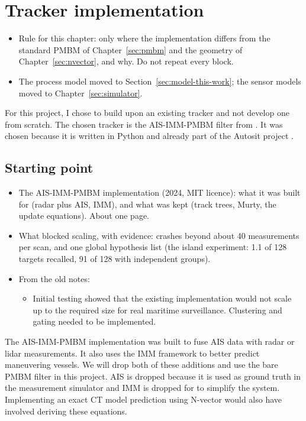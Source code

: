 \section{Tracker implementation}
\label{sec:implementation}
\label{sec:method}
\begin{itemize}
    \item Rule for this chapter: only where the implementation differs from the standard PMBM of Chapter~\ref{sec:pmbm} and the geometry of Chapter~\ref{sec:nvector}, and why. Do not repeat every block.
    \item The process model moved to Section~\ref{sec:model-this-work}; the sensor models moved to Chapter~\ref{sec:simulator}.
\end{itemize}

For this project, I chose to build upon an existing tracker and not develop one from scratch. The chosen tracker is the AIS-IMM-PMBM filter from \cite{ais_imm_pmbm}. It was chosen because it is written in Python and already part of the Autosit project \cite{autosit}.

\subsection{Starting point}
\label{sec:impl-start}
\begin{itemize}
    \item The AIS-IMM-PMBM implementation (2024, MIT licence): what it was built for (radar plus AIS, IMM), and what was kept (track trees, Murty, the update equations). About one page.
    \item What blocked scaling, with evidence: crashes beyond about 40 measurements per scan, and one global hypothesis list (the island experiment: 1.1 of 128 targets recalled, 91 of 128 with independent groups).
    \item From the old notes:
    \begin{itemize}
    \item Initial testing showed that the existing implementation would not scale up to the required size for real maritime surveillance. Clustering and gating needed to be implemented.
    \end{itemize}
\end{itemize}

The AIS-IMM-PMBM implementation was built to fuse AIS data with radar or lidar measurements. It also uses the IMM framework to better predict maneuvering vessels. We will drop both of these additions and use the bare PMBM filter in this project. AIS is dropped because it is used as ground truth in the measurement simulator and IMM is dropped for to simplify the system. Implementing an exact CT model prediction using N-vector would also have involved deriving these equations.
\medskip

